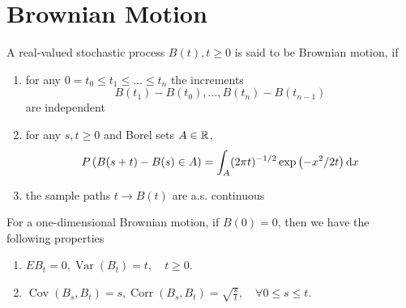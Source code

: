 \chapter{Brownian Motion}

\begin{definition}
	A real-valued stochastic process $B(t),t\geq 0$ is said to be Brownian motion, if
	\begin{enumerate}
		\item for any $0=t_{0}\leq t_{1}\leq\ldots\leq t_{n}$ the increments
		      \begin{equation*}
			      B\left(t_{1}\right)-B\left(t_{0}\right),\ldots,B\left(t_{n}\right)-B\left(t_{n-1}\right)
		      \end{equation*}
		      are independent
		\item for any $s,t\geq 0$ and Borel sets $A\in{\mathbb R}$,
		      \begin{equation}
			      P\left(B(s+t)-B(s)\in A\right)=\int_{A}(2\pi t)^{-1/2}\exp\left(-x^{2}/2t\right)\mathop{}\!\mathrm{d} x
		      \end{equation}
		\item the sample paths $t\rightarrow B(t)$ are a.s. continuous
	\end{enumerate}
\end{definition}

\begin{property}
	For a one-dimensional Brownian motion, if $B(0)=0$, then we have the following properties
	\begin{enumerate}
		\item $EB_{t}=0,\operatorname{Var}\left(B_{t}\right)=t,\quad t\geq 0$.
		\item $\operatorname{Cov}\left(B_{s},B_{t}\right)=s,\operatorname{Corr}\left(B_{s},B_{t}\right)=\sqrt{\frac{s}{t}},\quad\forall 0\leq s\leq t$.
	\end{enumerate}
\end{property}

